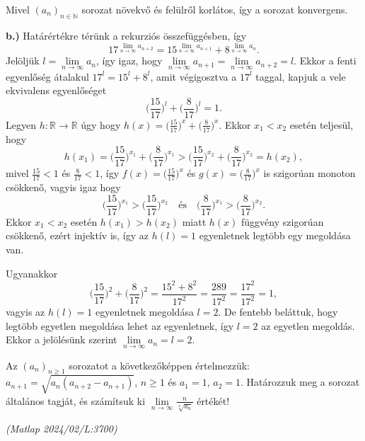 \begin{solution}
Mivel $(a_{n})_{n\in\mathbb{N}}$ sorozat növekvő és felülről korlátos,
így a sorozat konvergens.

\textbf{b.)} Határértékre térünk a rekurziós összefüggésben, így 
\[
17^{\lim\limits_{n\to\infty}a_{n+2}}=15^{\lim\limits_{n\to\infty}a_{n+1}}+8^{\lim\limits_{n\to\infty}a_{n}}.
\]
Jelöljük $l=\lim\limits_{n\to\infty}a_{n}$, így igaz, hogy $\lim\limits_{n\to\infty}a_{n+1}=\lim\limits_{n\to\infty}a_{n+2}=l$.
Ekkor a fenti egyenlőség átalakul $17^{l}=15^{l}+8^{l}$, amit végigosztva
a $17^{l}$ taggal, kapjuk a vele ekvivalens egyenlőséget 
\[
\Big(\frac{15}{17}\Big)^{l}+\Big(\frac{8}{17}\Big)^{l}=1.
\]
Legyen $h:\mathbb{R}\rightarrow\mathbb{R}$ úgy hogy $h(x)=\Big(\frac{15}{17}\Big)^{x}+\Big(\frac{8}{17}\Big)^{x}$.
Ekkor $x_{1}<x_{2}$ esetén teljesül, hogy 
\[
h(x_{1})=\Big(\frac{15}{17}\Big)^{x_{1}}+\Big(\frac{8}{17}\Big)^{x_{1}}>\Big(\frac{15}{17}\Big)^{x_{2}}+\Big(\frac{8}{17}\Big)^{x_{2}}=h(x_{2}),
\]
mivel $\frac{15}{17}<1$ és $\frac{8}{17}<1$, így $f(x)=\Big(\frac{15}{17}\Big)^{x}$
és $g(x)=\Big(\frac{8}{17}\Big)^{x}$ is szigorúan monoton csökkenő,
vagyis igaz hogy 
\[
\Big(\frac{15}{17}\Big)^{x_{1}}>\Big(\frac{15}{17}\Big)^{x_{2}}\quad\text{és}\quad\Big(\frac{8}{17}\Big)^{x_{1}}>\Big(\frac{8}{17}\Big)^{x_{2}}.
\]
Ekkor $x_{1}<x_{2}$ esetén $h(x_{1})>h(x_{2})$ miatt $h(x)$ függvény
szigorúan csökkenő, ezért injektív is, így az $h(l)=1$ egyenletnek
legtöbb egy megoldása van.

Ugyanakkor 
\[
\Big(\frac{15}{17}\Big)^{2}+\Big(\frac{8}{17}\Big)^{2}=\frac{15^{2}+8^{2}}{17^{2}}=\frac{289}{17^{2}}=\frac{17^{2}}{17^{2}}=1,
\]
vagyis az $h(l)=1$ egyenletnek megoldása $l=2$. De fentebb beláttuk,
hogy legtöbb egyetlen megoldása lehet az egyenletnek, így $l=2$ az
egyetlen megoldás. Ekkor a jelölésünk szerint $\lim\limits_{n\to\infty}a_{n}=l=2$.
\end{solution}
\begin{extraproblem}
Az $(a_{n})_{n\geq1}$ sorozatot a következőképpen értelmezzük: $a_{n+1}=\sqrt{a_{n}(a_{n+2}-a_{n+1})}$,
$n\geq1$ és $a_{1}=1$, $a_{2}=1$. Határozzuk meg a sorozat általános
tagját, és számítsuk ki $\lim\limits_{n\to\infty}\frac{n}{\sqrt[n]{a_{n}}}$
értékét! 
\begin{flushright}
\textit{(Matlap 2024/02/L:3700)} 
\par\end{flushright}
\end{extraproblem}

